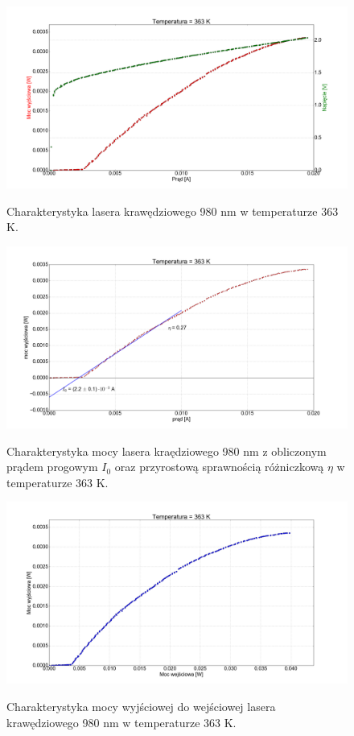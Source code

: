 \documentclass[a4paper, portrait,12pt]{report}
\begin{document}
\begin{figure}
\center
  \includegraphics[scale=0.30]{plot980/temp_90_IVL.png}
  \label{rys1}
  \caption{Charakterystyka lasera krawędziowego 980 nm w temperaturze 363 K.} 
\end{figure}

\begin{figure}
\center
  \includegraphics[scale=0.30]{plot980/temp_90_fit.png}
  \label{rys1}
  \caption{Charakterystyka mocy lasera kraędziowego 980 nm z obliczonym prądem progowym $I_0$ oraz przyrostową sprawnością różniczkową $\eta$ w temperaturze 363 K.} 
\end{figure}

\begin{figure}
\center
  \includegraphics[scale=0.30]{plot980/temp_90_power.png}
  \label{rys1}
  \caption{Charakterystyka mocy wyjściowej do wejściowej lasera krawędziowego 980 nm w temperaturze 363 K.} 
\end{figure}
\end{document}

